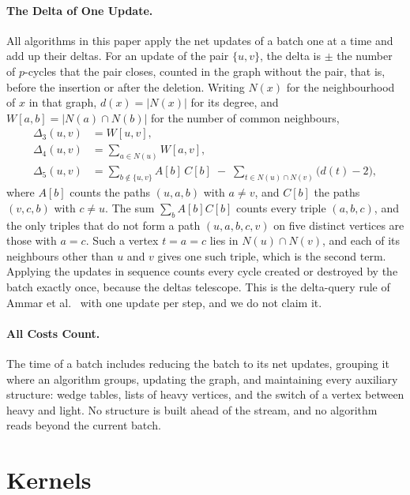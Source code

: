 \paragraph{The Delta of One Update.}
All algorithms in this paper apply the net updates of a batch one at a time and add up their deltas.
For an update of the pair $\{u, v\}$, the delta is $\pm$ the number of $p$-cycles that the pair closes, counted in the graph without the pair, that is, before the insertion or after the deletion.
Writing $N(x)$ for the neighbourhood of $x$ in that graph, $d(x) = |N(x)|$ for its degree, and $W[a, b] = |N(a) \cap N(b)|$ for the number of common neighbours,
\begin{align*}
  \Delta_3(u, v) &= W[u, v], \\
  \Delta_4(u, v) &= \sum_{a \in N(u)} W[a, v], \\
  \Delta_5(u, v) &= \sum_{b \notin \{u, v\}} A[b]\, C[b] \;-\; \sum_{t \in N(u) \cap N(v)} \bigl(d(t) - 2\bigr),
\end{align*}
where $A[b]$ counts the paths $(u, a, b)$ with $a \neq v$, and $C[b]$ the paths $(v, c, b)$ with $c \neq u$.
The sum $\sum_b A[b] C[b]$ counts every triple $(a, b, c)$, and the only triples that do not form a path $(u, a, b, c, v)$ on five distinct vertices are those with $a = c$.
Such a vertex $t = a = c$ lies in $N(u) \cap N(v)$, and each of its neighbours other than $u$ and $v$ gives one such triple, which is the second term.
Applying the updates in sequence counts every cycle created or destroyed by the batch exactly once, because the deltas telescope.
This is the delta-query rule of Ammar et al.~\cite{ammar-delta} with one update per step, and we do not claim it.

\paragraph{All Costs Count.}
The time of a batch includes reducing the batch to its net updates, grouping it where an algorithm groups, updating the graph, and maintaining every auxiliary structure: wedge tables, lists of heavy vertices, and the switch of a vertex between heavy and light.
No structure is built ahead of the stream, and no algorithm reads beyond the current batch.

\section{Kernels}
\label{sec:kernels}

